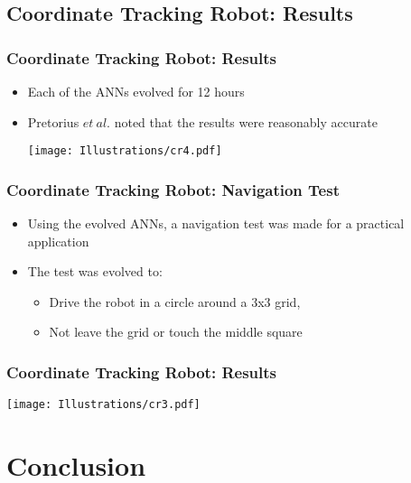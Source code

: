 \documentclass{beamer}
\begin{document}
\begin{frame}
\subsection*{Coordinate Tracking Robot: Results}
\begin{frame}
  \frametitle{Coordinate Tracking Robot: Results}
 \begin{itemize}
 \item Each of the ANNs evolved for 12 hours
 \item Pretorius $et~al.$ noted that the results were reasonably accurate
\begin{center}
 \texttt{[image: Illustrations/cr4.pdf]}
       \\
\end{center}
\end{itemize}
\end{frame}

\begin{frame}
\frametitle{Coordinate Tracking Robot: Navigation Test}
\begin{itemize}
\item Using the evolved ANNs, a navigation test was made for a practical application
\item The test was evolved to:
\begin{itemize}
\item Drive the robot in a circle around a 3x3 grid,
\item Not leave the grid or touch the middle square
\end{itemize}
\end{itemize}
\end{frame}

\begin{frame}
  \frametitle{Coordinate Tracking Robot: Results}
\begin{center}
 \texttt{[image: Illustrations/cr3.pdf]}
       \\
\end{center}
\end{frame}

\section{Conclusion}

\end{frame}
\end{document}
